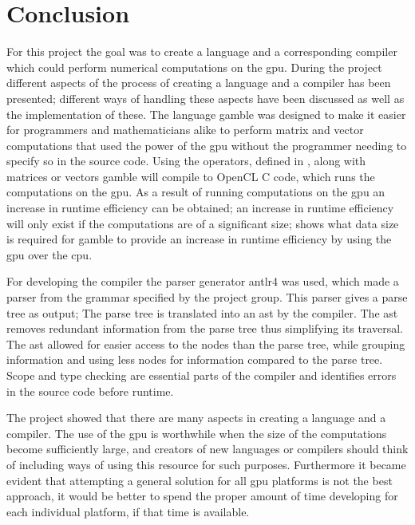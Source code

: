 \chapter{Conclusion} %
\label{cha:conclusion}
For this project the goal was to create a language and a corresponding compiler which could perform numerical computations on the \acrshort{gpu}.
During the project different aspects of the process of creating a language and a compiler has been presented; different ways of handling these aspects have been discussed as well as the implementation of these.
The language \gls{gamble} was designed to make it easier for programmers and mathematicians alike to perform matrix and vector computations that used the power of the \acrshort{gpu} without the programmer needing to specify so in the source code.
Using the operators, defined in , along with matrices or vectors \gls{gamble} will compile to OpenCL C code, which runs the computations on the \acrshort{gpu}.
As a result of running computations on the \acrshort{gpu} an increase in runtime efficiency can be obtained; an increase in runtime efficiency will only exist if the computations are of a significant size;  shows what data size is required for \gls{gamble} to provide an increase in runtime efficiency by using the \acrshort{gpu} over the \acrshort{cpu}.

For developing the compiler the parser generator \acrshort{antlr}4 was used, which made a parser from the grammar specified by the project group.
This parser gives a parse tree as output; The parse tree is translated into an \acrshort{ast} by the compiler.
The \acrshort{ast} removes redundant information from the parse tree thus simplifying its traversal.
The \acrshort{ast} allowed for easier access to the nodes than the parse tree, while grouping information and using less nodes for information compared to the parse tree.
Scope and type checking are essential parts of the compiler and identifies errors in the source code before runtime.

The project showed that there are many aspects in creating a language and a compiler.
The use of the \acrshort{gpu} is worthwhile when the size of the computations become sufficiently large, and creators of new languages or compilers should think of including ways of using this resource for such purposes.
Furthermore it became evident that attempting a general solution for all \acrshort{gpu} platforms is not the best approach, it would be better to spend the proper amount of time developing for each individual platform, if that time is available.
